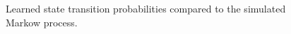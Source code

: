 \begin{figure}[htbp]
\begin{subfigure}[t]{0.45\textwidth}
    \end{subfigure}
    \caption{Learned state transition probabilities compared to the simulated Markow process.}
    \label{fig:markow_learning}
\end{figure}
